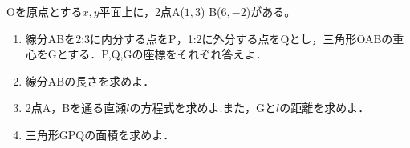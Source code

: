 \documentclass[8pt,dvipdfmx]{article}[b5paper]
\begin{document}
\begin{tcolorbox}[title=数学\textcircled{1} 4- 1 A]
Oを原点とする\(x, y\)平面上に，2点A(\(1, 3\)) B(\(6, -2\))がある。
\begin{enumerate}[(1)]
    \item 線分ABを2:3に内分する点をP，1:2に外分する点をQとし，三角形OABの重心をGとする．P,Q,Gの座標をそれぞれ答えよ．
    \item 線分ABの長さを求めよ．
    \item 2点A，Bを通る直瀬$l$の方程式を求めよ.また，Gと$l$の距離を求めよ．
    \item 三角形GPQの面積を求めよ．
\end{enumerate}
\end{tcolorbox}
\end{document}
